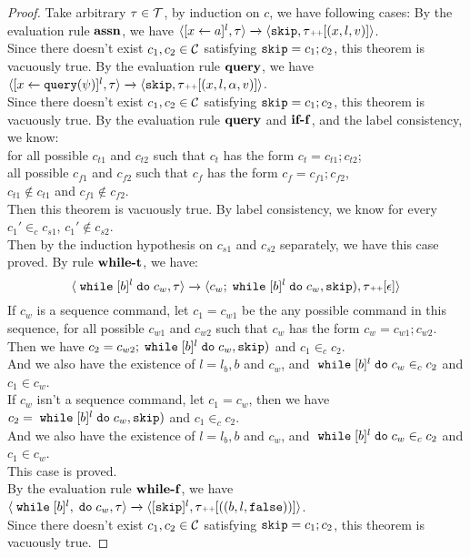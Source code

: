 \begin{proof}
	Take arbitrary $\mathtt{\tau} \in \mathcal{T}$, by induction on $c$, we have following cases:
		By the evaluation rule $\rname{assn}$, we have
		$
		{
		\langle [\mathrel{ {x} \leftarrow a }]^{l},  \mathtt{\tau}  \rangle 
		\xrightarrow{} 
		\langle \mathtt{skip}, \mathtt{\tau} {\scriptscriptstyle ++} [({x}, l, v) ] \rangle
		}$.
		\\
		Since there doesn't exist $c_1, c_2 \in \mathcal{C}$ satisfying $\mathtt{skip} = c_1; c_2$, this theorem is vacuously true.
		By the evaluation rule $\rname{query}$, we have
		$
		{
		\langle [\mathrel{ {x} \leftarrow {\tt query}(\psi) }]^{l},  \mathtt{\tau}  \rangle 
		\xrightarrow{} 
		\langle \mathtt{skip}, \mathtt{\tau} {\scriptscriptstyle ++} [({x}, l, \alpha, v) ] \rangle
		}$.
		\\
		Since there doesn't exist $c_1, c_2 \in \mathcal{C}$ satisfying $\mathtt{skip} = c_1; c_2$, this theorem is vacuously true.
		By the evaluation rule $\rname{query}$ and $\rname{if-f}$, and the label consistency, we know:
		\\
		for all possible $c_{t1}$ and $c_{t2}$ 
		such that $c_t$ has the form $c_t = c_{t1};c_{t2}$;
		\\
		all possible $c_{f1}$ and $c_{f2}$ 
		such that $c_f$ has the form $c_f = c_{f1};c_{f2}$,
		\\
		$c_{t1} \notin c_{t1}$ and $c_{f1} \notin c_{f2}$.
		\\
		Then this theorem is vacuously true.
		By label consistency, we know for every $c_1' \in_c c_{s1}$, $c_1' \notin c_{s2}$.
		\\
		Then by the induction hypothesis on $c_{s1}$ and $c_{s2}$ separately, we have this case proved.
		By rule $\rname{while-t}$, we have:
		\[
			\langle {\;\ensuremath{\mathtt{while}}\;[b]^{l} \;\ensuremath{\mathtt{do}}\;c_w, \ensuremath{\mathtt{\tau}}} \rangle
			\xrightarrow{} 
			\langle {
			c_w; \;\ensuremath{\mathtt{while}}\;[b]^{l} \;\ensuremath{\mathtt{do}}\;c_w,  \ensuremath{\mathtt{skip}}),
			\ensuremath{\mathtt{\tau}}{\scriptscriptstyle ++}[\ensuremath{\mathtt{\epsilon}}]} \rangle
		\]
		If $c_w$ is a sequence command,
		let $c_1 = c_{w1}$ be the any possible command in this sequence, for all possible $c_{w1}$ and $c_{w2}$ 
		such that $c_w$ has the form $c_w = c_{w1};c_{w2}$.
		\\
		Then we have $c_2 = c_{w2};\;\mathtt{while}\; [b]^{l} \;\mathtt{do}\; c_w,  \mathtt{skip})$ and $c_1 \in_c c_2$.
		\\
		And we also have the existence of $l = l_b, b$ and $c_w$, and $\;\mathtt{while}\; [b]^{l} \;\mathtt{do}\; c_w \in_c c_2$ and  $c_1 \in c_w$.
		\\
		If $c_w$ isn't a sequence command, let $c_1 = c_w$, then we have $c_2 = \;\mathtt{while}\; [b]^{l} \;\mathtt{do}\; c_w,  \mathtt{skip})$ 
		and $c_1 \in_c c_2$.
		\\
		And we also have the existence of $l = l_b, b$ and $c_w$, and $\;\mathtt{while}\; [b]^{l} \;\mathtt{do}\; c_w \in_c c_2$ and  $c_1 \in c_w$.
		\\
		This case is proved.
		\\
		By the evaluation rule $\rname{while-f}$, we have
		$
		{
			\langle {\;\ensuremath{\mathtt{while}}\;[b]^{l}, \;\ensuremath{\mathtt{do}}\;c_w, \ensuremath{\mathtt{\tau}}} \rangle
			\xrightarrow{} 
			\langle {
			[\ensuremath{\mathtt{skip}}]^l ,
			\ensuremath{\mathtt{\tau}}{\scriptscriptstyle ++}[((b, l, \ensuremath{\mathtt{false}}))]} \rangle
		}$.
		\\
		Since there doesn't exist $c_1, c_2 \in \mathcal{C}$ satisfying $\mathtt{skip} = c_1; c_2$, this theorem is vacuously true.
	\end{proof}
